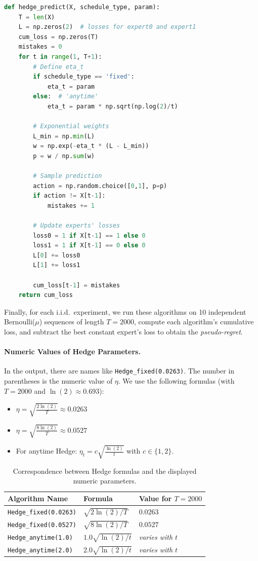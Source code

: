 \begin{lstlisting}[language=Python, caption={Hedge implementation.}]
def hedge_predict(X, schedule_type, param):
    T = len(X)
    L = np.zeros(2)  # losses for expert0 and expert1
    cum_loss = np.zeros(T)
    mistakes = 0
    for t in range(1, T+1):
        # Define eta_t
        if schedule_type == 'fixed':
            eta_t = param
        else:  # 'anytime'
            eta_t = param * np.sqrt(np.log(2)/t)

        # Exponential weights
        L_min = np.min(L)
        w = np.exp(-eta_t * (L - L_min))
        p = w / np.sum(w)

        # Sample prediction
        action = np.random.choice([0,1], p=p)
        if action != X[t-1]:
            mistakes += 1

        # Update experts' losses
        loss0 = 1 if X[t-1] == 1 else 0
        loss1 = 1 if X[t-1] == 0 else 0
        L[0] += loss0
        L[1] += loss1

        cum_loss[t-1] = mistakes
    return cum_loss
\end{lstlisting}

Finally, for each i.i.d.\ experiment, we run these algorithms on 10 independent Bernoulli(\(\mu\)) sequences of length \(T=2000\), compute each algorithm's cumulative loss, and subtract the best constant expert's loss to obtain the \emph{pseudo-regret}.

\paragraph{Numeric Values of Hedge Parameters.}
In the output, there are names like \texttt{Hedge\_fixed(0.0263)}.  The number in parentheses is the numeric value of \(\eta\).  We use the following formulas (with \(T=2000\) and \(\ln(2)\approx 0.693\)):

\begin{itemize}
\item \(\eta = \sqrt{\frac{2\ln(2)}{T}}\approx 0.0263\)
\item \(\eta = \sqrt{\frac{8\ln(2)}{T}}\approx 0.0527\)
\item For anytime Hedge: \(\eta_t = c \sqrt{\frac{\ln(2)}{t}}\) with \(c \in \{1,2\}\).
\end{itemize}

\begin{table}[h!]
\centering
\begin{tabular}{lll}
\hline
\textbf{Algorithm Name} & \textbf{Formula} & \textbf{Value for $T=2000$}\\
\hline
\texttt{Hedge\_fixed(0.0263)} & $\sqrt{2\ln(2)/T}$ & $0.0263$ \\
\texttt{Hedge\_fixed(0.0527)} & $\sqrt{8\ln(2)/T}$ & $0.0527$ \\
\texttt{Hedge\_anytime(1.0)}  & $1.0\sqrt{\ln(2)/t}$ & \emph{varies with $t$} \\
\texttt{Hedge\_anytime(2.0)}  & $2.0\sqrt{\ln(2)/t}$ & \emph{varies with $t$} \\
\hline
\end{tabular}
\caption{Correspondence between Hedge formulas and the displayed numeric parameters.}
\label{tab:hedge_values}
\end{table}

